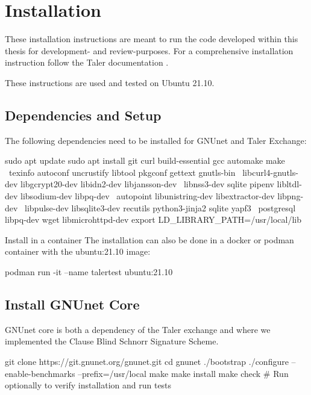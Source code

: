 \appendix

\chapter{Installation}
These installation instructions are meant to run the code developed within this thesis for development- and review-purposes.
For a comprehensive installation instruction follow the Taler documentation
\cite{taler-documentation}.

\begin{bfhNoteBox}
    These instructions are used and tested on Ubuntu 21.10.
\end{bfhNoteBox}

\section{Dependencies and Setup}
The following dependencies need to be installed for GNUnet and Taler Exchange:
\begin{ubuntu}
sudo apt update
sudo apt install git curl build-essential gcc automake make \ texinfo autoconf uncrustify libtool pkgconf gettext gnutls-bin \ libcurl4-gnutls-dev libgcrypt20-dev libidn2-dev libjansson-dev \ libnss3-dev sqlite pipenv libltdl-dev libsodium-dev libpq-dev \ autopoint libunistring-dev libextractor-dev libpng-dev \ libpulse-dev libsqlite3-dev recutils python3-jinja2 sqlite yapf3 \ postgresql libpq-dev wget libmicrohttpd-dev
export LD\_LIBRARY\_PATH=/usr/local/lib
\end{ubuntu}

\begin{bfhBox}{Install in a container}
The installation can also be done in a docker or podman container with the ubuntu:21.10 image:
\begin{ubuntu}
podman run -it --name talertest ubuntu:21.10
\end{ubuntu}
\end{bfhBox}

\section{Install GNUnet Core}
GNUnet core is both a dependency of the Taler exchange and where we implemented the Clause Blind Schnorr Signature Scheme.
\begin{ubuntu}
git clone https://git.gnunet.org/gnunet.git
cd gnunet
./bootstrap
./configure --enable-benchmarks --prefix=/usr/local
make
make install
make check # Run optionally to verify installation and run tests
\end{ubuntu}

